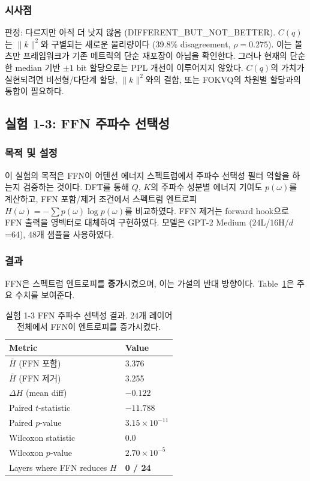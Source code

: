 \documentclass[11pt,a4paper]{article}
\begin{document}
\subsubsection{시사점}

판정: \textcolor{partial}{다르지만 아직 더 낫지 않음 (DIFFERENT\_BUT\_NOT\_BETTER)}.
$C(q)$는 $\|k\|^2$와 구별되는 새로운 물리량이다 (39.8\% disagreement, $\rho = 0.275$).
이는 볼츠만 프레임워크가 기존 메트릭의 단순 재포장이 아님을 확인한다.
그러나 현재의 단순한 median 기반 $\pm1$ bit 할당으로는 PPL 개선이 이루어지지 않았다.
$C(q)$의 가치가 실현되려면 비선형/다단계 할당, $\|k\|^2$와의 결합, 또는 FOKVQ의 차원별 할당과의 통합이 필요하다.

\subsection{실험 1-3: FFN 주파수 선택성}

\subsubsection{목적 및 설정}

이 실험의 목적은 FFN이 어텐션 에너지 스펙트럼에서 주파수 선택성 필터 역할을 하는지 검증하는 것이다.
DFT를 통해 $Q$, $K$의 주파수 성분별 에너지 기여도 $p(\omega)$를 계산하고, FFN 포함/제거 조건에서 스펙트럼 엔트로피 $H(\omega) = -\sum p(\omega) \log p(\omega)$를 비교하였다.
FFN 제거는 forward hook으로 FFN 출력을 영벡터로 대체하여 구현하였다.
모델은 GPT-2 Medium (24L/16H/$d$=64), 48개 샘플을 사용하였다.

\subsubsection{결과}

FFN은 스펙트럼 엔트로피를 \textbf{증가}시켰으며, 이는 가설의 반대 방향이다.
Table~\ref{tab:ffn}은 주요 수치를 보여준다.

\begin{table}[H]
\centering
\caption{실험 1-3 FFN 주파수 선택성 결과. 24개 레이어 전체에서 FFN이 엔트로피를 증가시켰다.}
\label{tab:ffn}
\begin{tabular}{ll}
\toprule
\textbf{Metric} & \textbf{Value} \\
\midrule
$\bar{H}$ (FFN 포함) & 3.376 \\
$\bar{H}$ (FFN 제거) & 3.255 \\
$\Delta H$ (mean diff) & $-0.122$ \\
Paired $t$-statistic & $-11.788$ \\
Paired $p$-value & $3.15 \times 10^{-11}$ \\
Wilcoxon statistic & 0.0 \\
Wilcoxon $p$-value & $2.70 \times 10^{-5}$ \\
Layers where FFN reduces $H$ & \textbf{0 / 24} \\
\bottomrule
\end{tabular}
\end{table}
\end{document}
